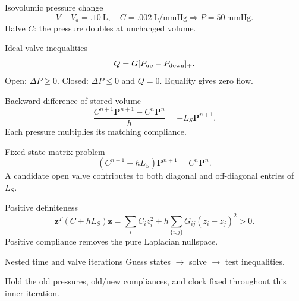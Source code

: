 \documentclass[aspectratio=169,11pt]{beamer}
\newcommand{\notestarget}{notes.pdf}\newcommand{\noteslabel}{Notes}
\begin{document}
\renewcommand{\notestarget}{notes.pdf\#note-pumping-by-a-time-dependent-storage-relation}
\begin{frame}[t,fragile,label=slide-isovolumic-pressure-change]{Isovolumic pressure change}
\[V-V_d=.10\ \mathrm L,\quad C=.002\ \mathrm L/\mathrm{mmHg}\Rightarrow P=50\ \mathrm{mmHg}.\]\pause{} Halve $C$: the pressure doubles at unchanged volume.
\end{frame}
\renewcommand{\notestarget}{notes.pdf\#note-valve-flow-and-the-pressure-inequalities}
\begin{frame}[t,fragile,label=slide-ideal-valve-inequalities]{Ideal-valve inequalities}
\[Q=G[P_{\rm up}-P_{\rm down}]_+.\]\pause{} Open: $\Delta P\geq0$. Closed: $\Delta P\leq0$ and $Q=0$. Equality gives zero flow.
\end{frame}
\renewcommand{\notestarget}{notes.pdf\#note-an-implicit-equation-for-pressure}
\begin{frame}[t,fragile,label=slide-backward-difference-of-stored-volume]{Backward difference of stored volume}
\[\frac{C^{n+1}\mathbf P^{n+1}-C^n\mathbf P^n}{h}=-L_S\mathbf P^{n+1}.\]\pause{} Each pressure multiplies its matching compliance.
\end{frame}
\renewcommand{\notestarget}{notes.pdf\#note-an-implicit-equation-for-pressure}
\begin{frame}[t,fragile,label=slide-fixed-state-matrix-problem]{Fixed-state matrix problem}
\[\boxed{(C^{n+1}+hL_S)\mathbf P^{n+1}=C^n\mathbf P^n.}\]\pause{} A candidate open valve contributes to both diagonal and off-diagonal entries of $L_S$.
\end{frame}
\renewcommand{\notestarget}{notes.pdf\#note-an-implicit-equation-for-pressure}
\begin{frame}[t,fragile,label=slide-positive-definiteness]{Positive definiteness}
\[\mathbf z^T(C+hL_S)\mathbf z=\sum_iC_i z_i^2+h\sum_{\{i,j\}}G_{ij}(z_i-z_j)^2>0.\]\pause{} Positive compliance removes the pure Laplacian nullspace.
\end{frame}
\renewcommand{\notestarget}{notes.pdf\#note-a-complete-valve-state-iteration}
\begin{frame}[t,fragile,label=slide-nested-time-and-valve-iterations]{Nested time and valve iterations}
Guess states $\to$ solve $\to$ test inequalities.\pause{}\par Hold the old pressures, old/new compliances, and clock fixed throughout this inner iteration.
\end{frame}
\renewcommand{\notestarget}{notes.pdf\#note-a-complete-valve-state-iteration}
\end{document}
